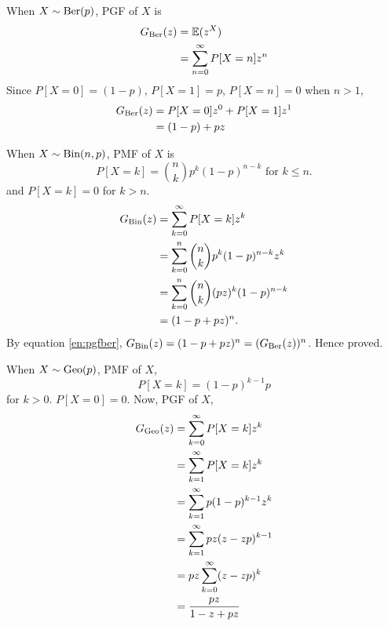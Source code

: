 \begin{solution}
	When $X\sim\text{Ber}(p)$, PGF of $X$ is
	\begin{align}
		G_{\text{Ber}}(z) & = \mathbb{E}(z^X)                     \\
		          & = \sum_{n=0}^\infty P[X=n]z^n
	\end{align}
	Since $P[X=0]=(1-p)$, $P[X=1] = p$, $P[X=n]=0$ when $n>1$,
	\begin{align}
		G_{\text{Ber}}(z) & = P[X=0]z^0 + P[X=1]z^1 \\
		          & = (1-p) + pz
		\label{en:pgfber}
	\end{align}

	When $X\sim\text{Bin}(n,p)$, PMF of $X$ is
	\begin{equation}
		P[X=k] = \binom{n}{k}p^k(1-p)^{n-k} \text{  for  } k\leq n.
	\end{equation}
	and $P[X=k]=0$ for $k>n$.
	\begin{align}
		G_{\text{Bin}}(z) & = \sum_{k=0}^\infty P[X=k]z^k                \\
		          & = \sum_{k=0}^n \binom{n}{k}p^k(1-p)^{n-k}z^k \\
		          & = \sum_{k=0}^n \binom{n}{k}(pz)^k(1-p)^{n-k} \\
		          & = (1-p + pz)^n.
		\label{en:pgfbin}
	\end{align}
	By equation \ref{en:pgfber}, $G_{\text{Bin}}(z) = (1-p + pz)^n =
	(G_{\text{Ber}}(z))^n$. Hence proved.

	When $X\sim\text{Geo}(p)$, PMF of $X$,
	\begin{equation}
		P[X=k] = (1-p)^{k-1}p
	\end{equation}
	for $k>0$. $P[X=0]=0$. Now, PGF of $X$,
	\begin{align}
		G_{\text{Geo}}(z) & = \sum_{k=0}^\infty P[X=k]z^k       \\
		          & = \sum_{k=1}^\infty P[X=k]z^k       \\
		          & = \sum_{k=1}^\infty p(1-p)^{k-1}z^k \\
		          & = \sum_{k=1}^\infty pz(z-zp)^{k-1}  \\
		          & = pz\sum_{k=0}^\infty (z-zp)^k      \\
		          & = \frac{pz}{1-z+pz}
	\end{align}


\end{solution}

